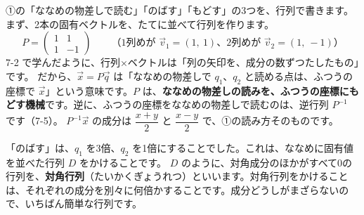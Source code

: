 \label{bk:7-9:jiku}①の「ななめの物差しで読む」「のばす」「もどす」の3つを、行列で書きます。まず、2本の固有ベクトルを、たてに並べて行列を作ります。
\[ P=\begin{pmatrix}1&1\\1&-1\end{pmatrix}\qquad\text{（1列めが $\vec v_1=(1,\ 1)$、2列めが $\vec v_2=(1,\ -1)$）} \]
7-2 で学んだように、行列×ベクトルは「列の矢印を、成分の数ずつたしたもの」です。
だから、$\vec x=P\vec q$ は「ななめの物差しで $q_1$、$q_2$ と読める点は、ふつうの座標で $\vec x$」という意味です。$P$ は、\textbf{ななめの物差しの読みを、ふつうの座標にもどす機械}です。逆に、ふつうの座標をななめの物差しで読むのは、逆行列 $P^{-1}$ です（7-5）。
$P^{-1}\vec x$ の成分は $\dfrac{x+y}{2}$ と $\dfrac{x-y}{2}$ で、①の読み方そのものです。

「のばす」は、$q_1$ を3倍、$q_2$ を1倍にすることでした。これは、ななめに固有値を並べた行列 $D$ をかけることです。
$D$ のように、対角成分のほかがすべて0の行列を、\textbf{対角行列}（たいかくぎょうれつ）といいます。対角行列をかけることは、それぞれの成分を別々に何倍かすることです。成分どうしがまざらないので、いちばん簡単な行列です。

